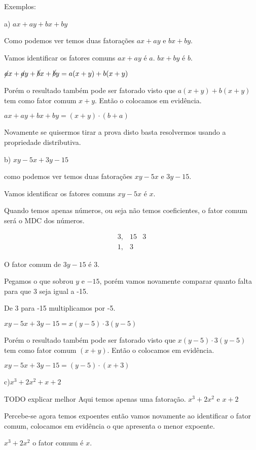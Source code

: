 \documentclass[letterpaper]{book}
\begin{document}
Exemplos:

a) \(ax + ay + bx + by\)

Como podemos ver temos duas fatorações
\(ax + ay\) e \(bx + by\).

Vamos identificar os fatores comuns
\(ax + ay\) é \(a\). \(bx + by\) é \(b\).

\(\cancel ax + \cancel ay + \cancel bx + \cancel by = a(x+y) + b(x+y)\)

Porém o resultado também pode ser fatorado visto que \(a(x+y) + b(x+y)\) tem como fator comum \(x+y\). Então o colocamos em evidência.

\(ax + ay + bx + by = (x+y)\cdot (b+a)\)

Novamente se quisermos tirar a prova disto basta resolvermos usando a propriedade distributiva.

b) \(xy - 5x + 3y - 15\)

como podemos ver temos duas fatorações
\(xy -5x\) e \(3y - 15\).

Vamos identificar os fatores comuns
\(xy - 5x\) é \(x\). 

Quando temos apenas números, ou seja não temos coeficientes, o fator comum será o MDC dos números.

\[
\begin{array}{cc|cc}
3, & 15 & 3 \\
1, & 3 
\end{array}
\]

O fator comum de \(3y - 15\) é $3$.

Pegamos o que sobrou \(y\) e $-15$, porém vamos novamente comparar quanto falta para que 3 seja igual a -15.

De 3 para -15 multiplicamos por -5.

\(xy - 5x + 3y - 15 = x(y - 5) \cdot 3(y -5)\)

Porém o resultado também pode ser fatorado visto que \(x(y - 5) \cdot 3(y -5)\) tem como fator comum $(x+y)$. Então o colocamos em evidência.

\(xy - 5x + 3y - 15 = (y - 5) \cdot (x + 3)\)

c)\(x^{3} + 2x^{2} + x + 2\)


TODO explicar melhor
Aqui temos apenas uma fatoração.
\(x^{3} + 2x^{2}\) e \(x + 2\)

Percebe-se agora temos expoentes então vamos novamente ao identificar o fator comum, colocamos em evidência o que apresenta o menor expoente.

\(x^{3} + 2x^{2}\) o fator comum é \(x\).
\end{document}
